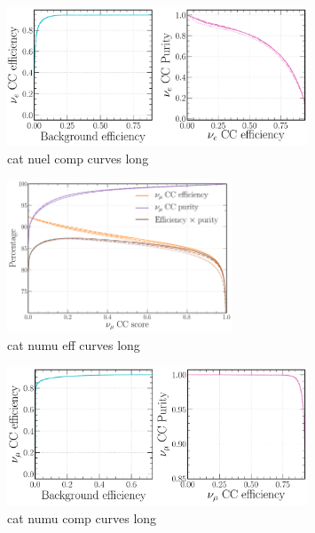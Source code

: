 \begin{figure} %
    \includegraphics[width=0.8\textwidth]{diagrams/6-cvn/chipsnet/cat_nuel_comp_curves.pdf}
    \caption[cat nuel comp curves short]
    {cat nuel comp curves long}
    \label{fig:cat_nuel_comp_curves}
\end{figure}

\begin{figure} %
    \includegraphics[width=0.6\textwidth]{diagrams/6-cvn/chipsnet/cat_numu_eff_curves.pdf}
    \caption[cat numu eff curves short]
    {cat numu eff curves long}
    \label{fig:cat_numu_eff_curves}
\end{figure}

\begin{figure} %
    \includegraphics[width=0.8\textwidth]{diagrams/6-cvn/chipsnet/cat_numu_comp_curves.pdf}
    \caption[cat numu comp curves short]
    {cat numu comp curves long}
    \label{fig:cat_numu_comp_curves}
\end{figure}

